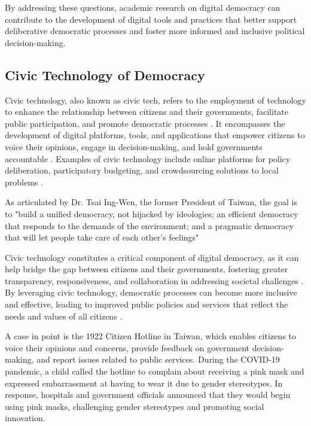 \documentclass{IEEEtran}
\begin{document}
By addressing these questions, academic research on digital democracy can contribute to the development of digital tools and practices that better support deliberative democratic processes and foster more informed and inclusive political decision-making.


\subsection{Civic Technology of Democracy}


Civic technology, also known as civic tech, refers to the employment of technology to enhance the relationship between citizens and their governments, facilitate public participation, and promote democratic processes \cite{hollands2015civic}. It encompasses the development of digital platforms, tools, and applications that empower citizens to voice their opinions, engage in decision-making, and hold governments accountable \cite{susha2015civic}. Examples of civic technology include online platforms for policy deliberation, participatory budgeting, and crowdsourcing solutions to local problems \cite{schrock2016civic}.

As articulated by Dr. Tsai Ing-Wen, the former President of Taiwan, the goal is to "build a unified democracy, not hijacked by ideologies; an efficient democracy that responds to the demands of the environment; and a pragmatic democracy that will let people take care of each other's feelings" 

Civic technology constitutes a critical component of digital democracy, as it can help bridge the gap between citizens and their governments, fostering greater transparency, responsiveness, and collaboration in addressing societal challenges \cite{townsend2013smart}. By leveraging civic technology, democratic processes can become more inclusive and effective, leading to improved public policies and services that reflect the needs and values of all citizens \cite{hollands2015civic}.

A case in point is the 1922 Citizen Hotline in Taiwan, which enables citizens to voice their opinions and concerns, provide feedback on government decision-making, and report issues related to public services. During the COVID-19 pandemic, a child called the hotline to complain about receiving a pink mask and expressed embarrassment at having to wear it due to gender stereotypes. In response, hospitals and government officials announced that they would begin using pink masks, challenging gender stereotypes and promoting social innovation.
\end{document}
